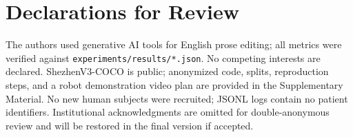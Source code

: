 \section*{Declarations for Review}
The authors used generative AI tools for English prose editing; all metrics were verified against \texttt{experiments/results/*.json}.
No competing interests are declared.
ShezhenV3-COCO is public; anonymized code, splits, reproduction steps, and a robot demonstration video plan are provided in the Supplementary Material.
No new human subjects were recruited; JSONL logs contain no patient identifiers.
Institutional acknowledgments are omitted for double-anonymous review and will be restored in the final version if accepted.
